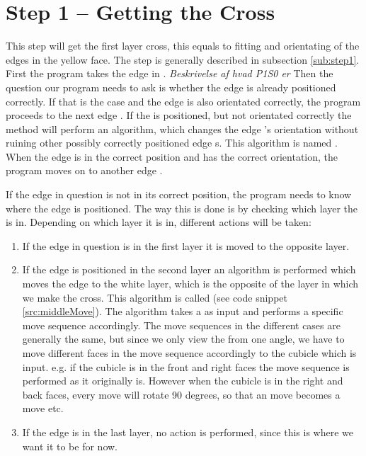 \section{Step 1 -- Getting the Cross}
This step will get the first layer cross, this equals to fitting and orientating of the edges in the yellow face. 
The step is generally described in subsection \ref{sub:step1}.
First the program takes the edge \cubie{} in \cubicle{} . \emph{Beskrivelse af hvad P1S0 er}
Then the question our program needs to ask is whether the edge \cpiece{} is already positioned correctly.
If that is the case and the edge \cpiece{} is also orientated correctly, the program proceeds to the next edge \cpiece{}.
If the \cubicle{} is positioned, but not orientated correctly the method will perform an algorithm, which changes the edge \cpiece{}'s orientation without ruining other possibly correctly positioned edge \cpiece{}s. 
This algorithm is named . When the edge \cpiece{} is in the correct position and has the correct orientation, the program moves on to another edge \cpiece{}. 

If the edge \cpiece{} in question is not in its correct position, the program needs to know where the edge is positioned.
The way this is done is by checking which layer the \cubie{} is in.
Depending on which layer it is in, different actions will be taken:
\begin{enumerate}
	\item If the edge \cpiece{} in question is in the first layer it is moved to the opposite layer.
	\item If the edge \cpiece{} is positioned in the second layer an algorithm is performed which moves the edge \cpiece{} to the white layer, which is the opposite of the layer in which we make the cross. This algorithm is called  (see code snippet \ref{src:middleMove}). The algorithm takes a \cubicle{} as input and performs a specific move sequence accordingly. The move sequences in the different cases are generally the same, but since we only view the \rubik{} from one angle, we have to move different faces in the move sequence accordingly to the cubicle which is input. e.g. if the cubicle is in the front and right faces the move sequence is performed as it originally is. However when the cubicle is in the right and back faces, every move will rotate 90 degrees, so that an  move becomes a  move etc.
	\item If the edge \cubie{} is in the last layer, no action is performed, since this is where we want it to be for now.
\end{enumerate}

